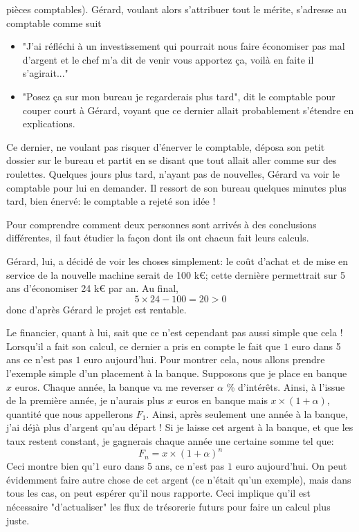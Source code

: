 pièces comptables).
Gérard, voulant alors s'attribuer tout le mérite, s'adresse 
au comptable comme suit \\
\begin{itemize}
  \item "J'ai réfléchi à un investissement qui pourrait nous faire 
    économiser pas mal d'argent et le chef m'a dit de venir vous apportez ça,
	voilà en faite il s'agirait..."
  \item "Posez ça sur mon bureau je regarderais plus tard", 
    dit le comptable pour couper court à Gérard, voyant que 
    ce dernier allait probablement s'étendre en explications.
\end{itemize}
\hspace*{\parindent}Ce dernier, ne voulant pas risquer d'énerver le comptable, 
déposa son petit dossier sur le bureau et partit en se disant 
que tout allait aller comme sur des roulettes.
\hspace*{\parindent}Quelques jours plus tard, n'ayant pas de nouvelles,
Gérard va voir le comptable pour lui en demander. 
Il ressort de son bureau quelques minutes plus tard, bien 
énervé: le comptable a rejeté son idée ! 


Pour comprendre comment deux personnes sont arrivés 
à des conclusions différentes, il faut étudier la façon 
dont ils ont chacun fait leurs calculs.

Gérard, lui, a décidé de voir les choses simplement: le 
coût d'achat et de mise en service de la nouvelle machine 
serait de 100 k\euro\/; cette dernière permettrait sur 5 ans 
d'économiser 24 k\euro\/ par an. Au final, 
\[ 5 \times 24 - 100 = 20 > 0 \]
donc d'après Gérard le projet est rentable.

Le financier, quant à lui, sait que ce n'est 
cependant pas aussi simple que cela ! 
Lorsqu'il a fait son calcul, ce dernier a pris en compte 
le fait que $1$ euro dans 5 ans ce n'est pas $1$ euro aujourd'hui. 
Pour montrer cela, nous allons prendre l'exemple simple d'un placement à 
la banque. Supposons que je place en banque $x$ euros. 
Chaque année, la banque va me reverser $\alpha$ \% d'intérêts.
Ainsi, à l'issue de la première année, je n'aurais plus $x$ 
euros en banque mais $x \times (1+\alpha)$, quantité 
que nous appellerons $F_1$. 
\hspace*{\parindent}Ainsi, après seulement une année à la banque, 
j'ai déjà plus d'argent qu'au départ !
Si je laisse cet argent à la banque, et que les taux restent 
constant, je gagnerais chaque année une certaine somme tel que:
\[ F_n = x \times (1+\alpha)^n \]
Ceci montre bien qu'$1$ euro dans 5 ans, ce n'est pas $1$ euro 
aujourd'hui.
On peut évidemment faire autre chose de cet argent 
(ce n'était qu'un exemple), mais dans 
tous les cas, on peut espérer qu'il nous rapporte. 
Ceci implique qu'il est nécessaire "d'actualiser" les 
flux de trésorerie futurs pour faire un calcul plus juste.

